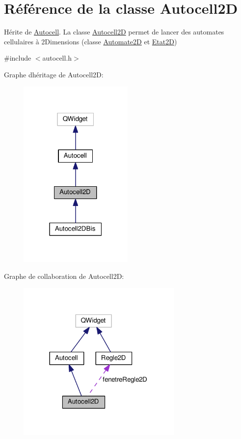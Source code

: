 \hypertarget{class_autocell2_d}{}\section{Référence de la classe Autocell2D}
\label{class_autocell2_d}


Hérite de \hyperlink{class_autocell}{Autocell}. La classe \hyperlink{class_autocell2_d}{Autocell2D} permet de lancer des automates cellulaires à 2\+Dimensions (classe \hyperlink{class_automate2_d}{Automate2D} et \hyperlink{class_etat2_d}{Etat2D})  




{\ttfamily \#include $<$autocell.\+h$>$}



Graphe d\textquotesingle{}héritage de Autocell2D\+:
\nopagebreak
\begin{figure}[H]
\begin{center}
\leavevmode
\includegraphics[width=159pt]{class_autocell2_d__inherit__graph}
\end{center}
\end{figure}


Graphe de collaboration de Autocell2D\+:
\nopagebreak
\begin{figure}[H]
\begin{center}
\leavevmode
\includegraphics[width=230pt]{class_autocell2_d__coll__graph}
\end{center}
\end{figure}
